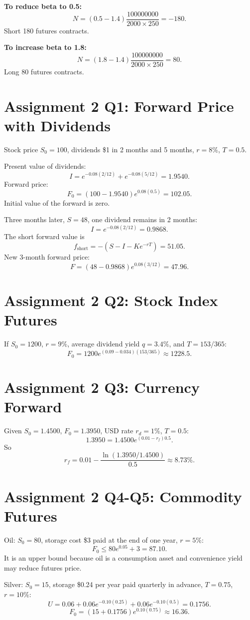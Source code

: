 \documentclass[11pt,a4paper,openany]{ctexbook}
\begin{document}
\textbf{To reduce beta to 0.5:}
\[
N=(0.5-1.4)\frac{100000000}{2000\times250}=-180.
\]
Short 180 futures contracts.

\textbf{To increase beta to 1.8:}
\[
N=(1.8-1.4)\frac{100000000}{2000\times250}=80.
\]
Long 80 futures contracts.

\section{Assignment 2 Q1: Forward Price with Dividends}
Stock price $S_0=100$, dividends \$1 in 2 months and 5 months, $r=8\%$, $T=0.5$.

Present value of dividends:
\[
I=e^{-0.08(2/12)}+e^{-0.08(5/12)}=1.9540.
\]
Forward price:
\[
F_0=(100-1.9540)e^{0.08(0.5)}=102.05.
\]
Initial value of the forward is zero.

Three months later, $S=48$, one dividend remains in 2 months:
\[
I=e^{-0.08(2/12)}=0.9868.
\]
The short forward value is
\[
f_{\text{short}}=-\left(S-I-Ke^{-rT}\right)=51.05.
\]
New 3-month forward price:
\[
F=(48-0.9868)e^{0.08(3/12)}=47.96.
\]

\section{Assignment 2 Q2: Stock Index Futures}
If $S_0=1200$, $r=9\%$, average dividend yield $q=3.4\%$, and $T=153/365$:
\[
F_0=1200e^{(0.09-0.034)(153/365)}\approx1228.5.
\]

\section{Assignment 2 Q3: Currency Forward}
Given $S_0=1.4500$, $F_0=1.3950$, USD rate $r_d=1\%$, $T=0.5$:
\[
1.3950=1.4500e^{(0.01-r_f)0.5}.
\]
So
\[
r_f=0.01-\frac{\ln(1.3950/1.4500)}{0.5}\approx8.73\%.
\]

\section{Assignment 2 Q4-Q5: Commodity Futures}
Oil: $S_0=80$, storage cost \$3 paid at the end of one year, $r=5\%$:
\[
F_0\leq80e^{0.05}+3=87.10.
\]
It is an upper bound because oil is a consumption asset and convenience yield may reduce futures price.

Silver: $S_0=15$, storage \$0.24 per year paid quarterly in advance, $T=0.75$, $r=10\%$:
\[
U=0.06+0.06e^{-0.10(0.25)}+0.06e^{-0.10(0.5)}=0.1756.
\]
\[
F_0=(15+0.1756)e^{0.10(0.75)}\approx16.36.
\]
\end{document}
